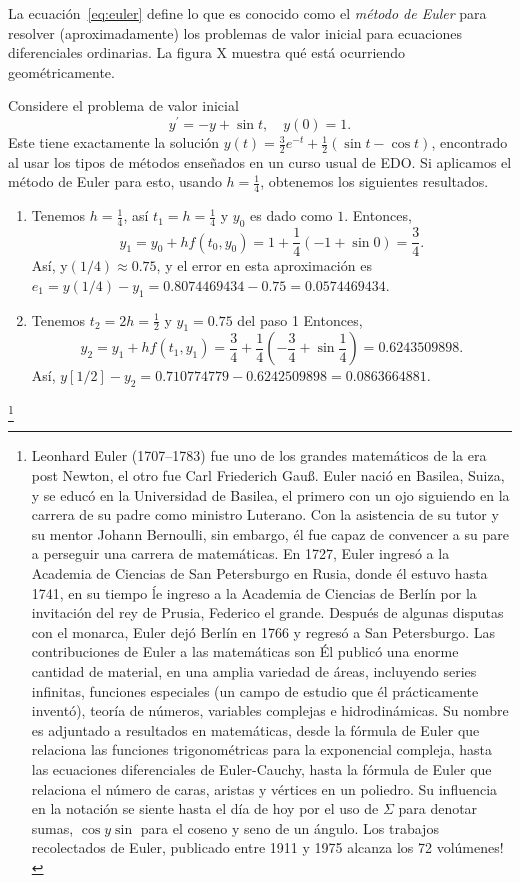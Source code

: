 La ecuación~\eqref{eq:euler} define lo que es conocido como el \emph{método de Euler} para resolver (aproximadamente) los problemas de valor inicial para ecuaciones diferenciales ordinarias. La figura X muestra qué está ocurriendo geométricamente.

\begin{example}
	Considere el problema de valor inicial \[ y^{\prime}=-y+\sin t,\quad y\left(0\right)=1. \]
	Este tiene exactamente la solución $y\left(t\right)=\frac{3}{2}e^{-t}+\frac{1}{2}\left(\sin t-\cos t\right)$, encontrado al usar los tipos de métodos enseñados en un curso usual de EDO. Si aplicamos el método de Euler para esto, usando $h=\frac{1}{4}$, obtenemos los siguientes resultados.
	\begin{enumerate}[Paso 1]
		\item Tenemos $h=\frac{1}{4}$, así $t_{1}=h=\frac{1}{4}$ y $y_{0}$ es dado como $1$. Entonces, \[ y_{1}=y_{0}+hf\left(t_{0},y_{0}\right)=1+\frac{1}{4}\left(-1+\sin 0\right)=\frac{3}{4}. \] Así, y$\left(1/4\right)\approx0.75$, y el error en esta aproximación es $e_{1}=y\left(1/4\right)-y_{1}=0.8074469434-0.75=0.0574469434$.
		\item Tenemos $t_{2}=2h=\frac{1}{2}$ y $y_{1}=0.75$ del paso 1%
		Entonces, \[ y_{2}=y_{1}+hf\left(t_{1},y_{1}\right)=\frac{3}{4}+\frac{1}{4}\left(-\frac{3}{4}+\sin\frac{1}{4}\right)=0.6243509898. \] Así, $y\left[1/2\right]-y_{2}=0.710774779-0.6242509898=0.0863664881$.
	\end{enumerate}
\end{example}\footnote{Leonhard Euler (1707--1783) fue uno de los grandes matemáticos de la era post Newton, el otro fue Carl Friederich Gau\ss. Euler nació en Basilea, Suiza, y se educó en la Universidad de Basilea, el primero con un ojo siguiendo en la carrera de su padre como ministro Luterano. Con la asistencia de su tutor y su mentor Johann Bernoulli, sin embargo, él fue capaz de convencer a su pare a perseguir una carrera de matemáticas. En 1727, Euler ingresó a la Academia de Ciencias de San Petersburgo en Rusia, donde él estuvo hasta 1741, en su tiempo ĺe ingreso a la Academia de Ciencias de Berlín por la invitación del rey de Prusia, Federico el grande. Después de algunas disputas con el monarca, Euler dejó Berlín en 1766 y regresó a San Petersburgo. Las contribuciones de Euler a las matemáticas son %
Él publicó una enorme cantidad de material, en una amplia variedad de áreas, incluyendo series infinitas, funciones especiales (un campo de estudio que él prácticamente inventó), teoría de números, variables complejas e hidrodinámicas. Su nombre es adjuntado a resultados%
en matemáticas, desde la fórmula de Euler que relaciona las funciones trigonométricas para la exponencial compleja, hasta las ecuaciones diferenciales de Euler-Cauchy, hasta la fórmula de Euler que relaciona el número de caras, aristas y vértices en un poliedro. Su influencia en la notación se siente hasta el día de hoy por el uso de $\Sigma$ para denotar sumas, $\cos y $$\sin$ para el coseno y seno de un ángulo. Los trabajos recolectados de Euler, publicado entre 1911 y 1975 alcanza los 72 volúmenes!

}
